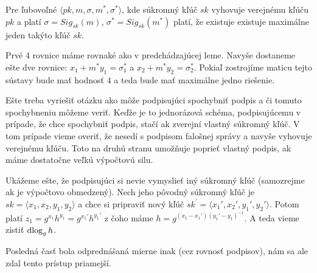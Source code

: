 \begin{lema}
    Pre ľubovoľné $\langle pk, m, \sigma, m^*, \sigma^* \rangle$, kde
    súkromný kľúč $sk$ vyhovuje verejnému kľúču $pk$ a platí
    $\sigma = Sig_{sk}(m)$, $\sigma^* = Sig_{sk}(m^*)$ platí,
    že existuje existuje maximálne jeden takýto kľúč $sk$.
\end{lema}

\begin{dokaz}
    Prvé 4 rovnice máme rovnaké ako v predchádzajúcej leme.
    Navyše dostaneme ešte dve rovnice: $x_1 + m^*y_1 = \sigma_1^*$ a
    $x_2 + m^* y_2 = \sigma_2^*$.
    Pokiaľ zostrojíme maticu tejto sústavy bude mať hodnosť $4$ 
    a teda bude mať maximálne jedno riešenie.
\end{dokaz}


Ešte treba vyriešiť otázku ako môže podpisujúci spochybniť podpis 
a či tomuto spochybneniu môžeme veriť.
Keďže je to jednorázová schéma, podpisujúcemu v prípade,
že chce spochybniť podpis, stačí ak zverejní vlastný súkromný kľúč.
V tom prípade vieme overiť, že nesedí s podpisom falošnej správy
a navyše vyhovuje verejnému kľúču. Toto na druhú stranu
umožňuje poprieť vlastný podpis, ak máme dostatočne veľkú výpočtovú
silu.

Ukážeme ešte, že podpisujúci si nevie vymyslieť iný súkromný kľúč
(samozrejme ak je výpočtovo obmedzený). 
Nech jeho pôvodný súkromný kľúč je 
$sk = \langle x_1, x_2, y_1, y_2 \rangle$ a
chce si pripraviť nový kľúč
$sk^{'} = \langle x_1', x_2', y_1', y_2' \rangle$.
Potom platí $z_1 = g^{x_1} h^{y_1} = g^{x_1'} h^{y_1'}$ z čoho máme 
$h = g^{(x_1 - x_1')(y_1' - y_1)^{-1}}$.
A teda vieme zistiť $\operatorname{dlog}_g h$.

\begin{poznamka}
    Posledná časť bola odprednášaná mierne inak (cez rovnosť
    podpisov), nám sa ale zdal tento prístup priamejší.
\end{poznamka}
